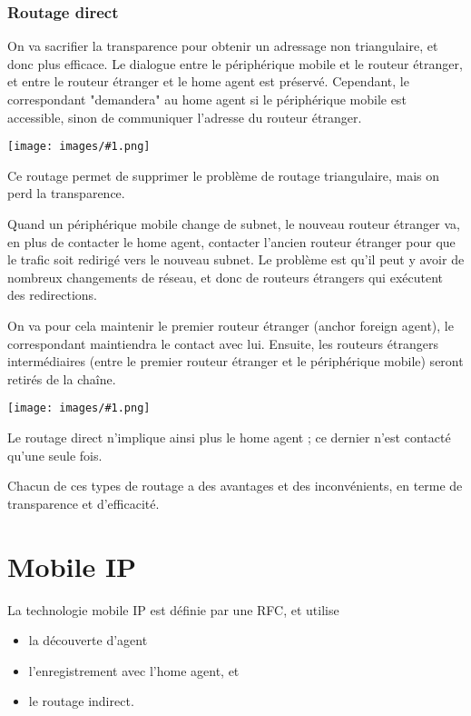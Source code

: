 \documentclass[10pt,a4paper]{report}
\newcommand{\dessin}[1]{\begin{center}\texttt{[image: images/\#1.png]}\end{center}}
\begin{document}
		\subsubsection{Routage direct}
  
		On va sacrifier la transparence pour obtenir un adressage non triangulaire, et donc plus efficace. Le dialogue entre le périphérique mobile et le routeur étranger, et entre le routeur étranger et le home agent est préservé. Cependant, le correspondant "demandera" au home agent si le périphérique mobile est accessible, sinon de communiquer l'adresse du routeur étranger.
  
		\dessin{54}
 		
 		Ce routage permet de supprimer le problème de routage triangulaire, mais on perd la transparence.
 		
		Quand un périphérique mobile change de subnet, le nouveau routeur étranger va, en plus de contacter le home agent, contacter l'ancien routeur étranger pour que le trafic soit redirigé vers le nouveau subnet. Le problème est qu'il peut y avoir de nombreux changements de réseau, et donc de routeurs étrangers qui exécutent des redirections.
  
		On va pour cela maintenir le premier routeur étranger (anchor foreign agent), le correspondant maintiendra le contact avec lui. Ensuite, les routeurs étrangers intermédiaires (entre le premier routeur étranger et le périphérique mobile) seront retirés de la chaîne.
  		
		\dessin{55}
		
		Le routage direct n'implique ainsi plus le home agent ; ce dernier n'est contacté qu'une seule fois.
  
		Chacun de ces types de routage a des avantages et des inconvénients, en terme de transparence et d'efficacité.
  

	\section{Mobile IP}
		
	La technologie mobile IP est définie par une RFC, et utilise
		
	\begin{itemize}
		\item la découverte d'agent
		\item l'enregistrement avec l'home agent, et
		\item le routage indirect.
	\end{itemize}
	
\end{document}
